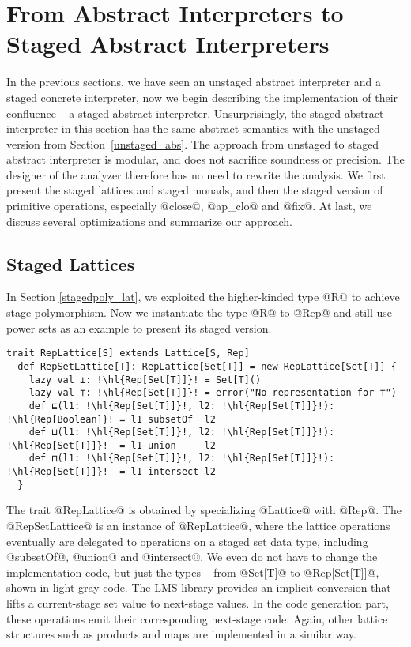 \section{From Abstract Interpreters to Staged Abstract Interpreters} \label{sai}

In the previous sections, we have seen an unstaged abstract interpreter and a
staged concrete interpreter, now we begin describing the implementation of their
confluence -- a staged abstract interpreter.
Unsurprisingly, the staged abstract interpreter in this section has the same
abstract semantics with the unstaged version from Section~\ref{unstaged_abs}.
The approach from unstaged to staged abstract interpreter is modular,
and does not sacrifice soundness or precision. The designer of the
analyzer therefore has no need to rewrite the analysis. We first present the
staged lattices and staged monads, and then the staged version of primitive
operations, especially @close@, @ap_clo@ and @fix@. At last, we discuss several
optimizations and summarize our approach.

\subsection{Staged Lattices}

In Section \ref{stagedpoly_lat}, we exploited the higher-kinded type @R@ to
achieve stage polymorphism. Now we instantiate the type @R@ to @Rep@ and
still use power sets as an example to present its staged version.
\begin{lstlisting}[escapechar=!]
  trait RepLattice[S] extends Lattice[S, Rep]
  def RepSetLattice[T]: RepLattice[Set[T]] = new RepLattice[Set[T]] {
    lazy val ⊥: !\hl{Rep[Set[T]]}! = Set[T]()
    lazy val ⊤: !\hl{Rep[Set[T]]}! = error("No representation for ⊤")
    def ⊑(l1: !\hl{Rep[Set[T]]}!, l2: !\hl{Rep[Set[T]]}!): !\hl{Rep[Boolean]}! = l1 subsetOf  l2
    def ⊔(l1: !\hl{Rep[Set[T]]}!, l2: !\hl{Rep[Set[T]]}!): !\hl{Rep[Set[T]]}!  = l1 union     l2
    def ⊓(l1: !\hl{Rep[Set[T]]}!, l2: !\hl{Rep[Set[T]]}!): !\hl{Rep[Set[T]]}!  = l1 intersect l2
  }
\end{lstlisting}

The trait @RepLattice@ is obtained by specializing @Lattice@ with @Rep@.
The @RepSetLattice@ is an instance of @RepLattice@, where the lattice operations
eventually are delegated to operations on a staged set data type, including
@subsetOf@, @union@ and @intersect@. We even do not have to change the
implementation code, but just the types -- from @Set[T]@ to @Rep[Set[T]]@, shown
in light gray code. The LMS library provides an implicit conversion that lifts a
current-stage set value to next-stage values. In the code generation part, these
operations emit their corresponding next-stage code. Again, other lattice
structures such as products and maps are implemented in a similar way.

